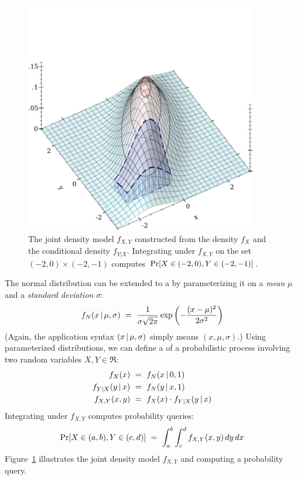 \begin{figure}[tb]\centering
\includegraphics[width=4in]{figures/2d-density-integrate}
\caption[Joint density model plot]{The joint density model $f_{X,Y}$ constructed from the density $f_X$ and the conditional density $f_{Y|X}$. Integrating under $f_{X,Y}$ on the set $(-2,0) \times (-2,-1)$ computes $\mathrm{Pr}\!\left[{X \in (-2,0), Y \in (-2,-1)}\right]$.}
\label{fig:joint-density-model}
\end{figure}

The normal distribution can be extended to a  by parameterizing it on a \emph{mean} $\mu$ and a \emph{standard deviation} $\sigma$:
\begin{equation}
	f_N(x \given \mu,\sigma)\ =\ \frac{1}{\sigma\sqrt{2\pi}} \exp\left(-\frac{(x-\mu)^2}{2\sigma^2}\right)
\end{equation}
(Again, the application syntax $(x \,|\, \mu, \sigma)$ simply means $(x,\mu,\sigma)$.)
Using parameterized distributions, we can define a  of a probabilistic process involving two random variables $X,Y \in \Re$:
\begin{equation}
\begin{aligned}
	f_X(x)&\ =\ f_N(x \,|\, 0,1) \\
	f_{Y|X}(y \,|\, x)&\ =\ f_N(y \,|\, x,1) \\
	f_{X,Y}(x,y)&\ =\ f_X(x) \cdot f_{Y|X}(y \,|\, x)
\end{aligned}
\end{equation}
Integrating under $f_{X,Y}$ computes probability queries:
\begin{equation}
	\mathrm{Pr}\!\left[{X \in (a,b), Y \in (c,d)}\right]\ =\ \int_a^b \int_c^d f_{X,Y}(x,y)\,dy\,dx
\end{equation}
Figure~\ref{fig:joint-density-model} illustrates the joint density model $f_{X,Y}$ and computing a probability query.

